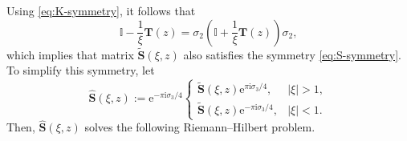 \documentclass[pdftex]{sigma}
\numberwithin{equation}{section}
\newcommand{\ee}{\mathrm{e}}
\newcommand{\ii}{\mathrm{i}}
\begin{document}
Using \eqref{eq:K-symmetry}, it follows that
\[
\mathbb I - \dfrac{1}{\xi}\mathbf T(z) = \sigma_2\left( \mathbb I + \dfrac{1}{\xi}\mathbf T(z) \right) \sigma_2,
\]
which implies that matrix $\widetilde{\mathbf{S}}(\xi, z)$ also satisfies the symmetry \eqref{eq:S-symmetry}. To simplify this symmetry, let
\begin{equation}
\widehat{\mathbf{S}}(\xi, z) := \ee^{-\pi \ii \sigma_3/4 } \begin{cases} \widetilde{\mathbf{S}}(\xi, z) \ee^{\pi \ii \sigma_3/4}, & |\xi| >1, \\
\widetilde{\mathbf{S}}(\xi, z) \ee^{-\pi \ii \sigma_3/4}, & |\xi| <1.
\end{cases}
 \label{eq:rotation-transformation}
\end{equation}
Then, $\widehat{\mathbf{S}}(\xi, z)$ solves the following Riemann--Hilbert problem.
\end{document}
